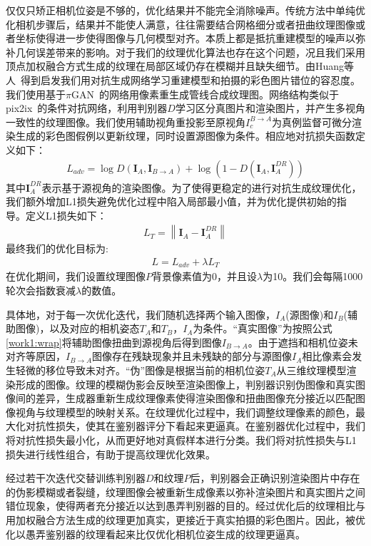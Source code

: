 仅仅只矫正相机位姿是不够的，优化结果并不能完全消除噪声。传统方法中单纯优化相机步骤后，结果并不能使人满意，往往需要结合网格细分或者扭曲纹理图像或者坐标使得进一步使得图像与几何模型对齐。本质上都是抵抗重建模型的噪声以弥补几何误差带来的影响。对于我们的纹理优化算法也存在这个问题，况且我们采用顶点加权融合方式生成的纹理在局部区域仍存在模糊并且缺失细节。由Huang等人~\cite{JingweiHuang2020AdversarialTO}得到启发我们用对抗生成网络学习重建模型和拍摄的彩色图片错位的容忍度。我们使用基于$\pi$GAN~\cite{chanmonteiro2020pi-GAN,liu2018intriguing}的网络用像素重生成管线合成纹理图。网络结构类似于pix2ix~\cite{isola2017image}的条件对抗网络，利用判别器$D$学习区分真图片和渲染图片，并产生多视角一致性的纹理图像。我们使用辅助视角重投影至原视角$I_c^{B\to A}$为真例监督可微分渲染生成的彩色图假例以更新纹理，同时设置源图像为条件。相应地对抗损失函数定义如下：
\begin{align}
	L_{a d v}=\log D\left(\boldsymbol{I}_{A}, \boldsymbol{I}_{B \rightarrow A}\right)+\log \left(1-D\left(\boldsymbol{I}_{A}, \boldsymbol{I}_{A}^{D R}\right)\right) 
\end{align}
其中$\boldsymbol{I}_{A}^{D R}$表示基于源视角的渲染图像。为了使得更稳定的进行对抗生成纹理优化，我们额外增加L1损失避免优化过程中陷入局部最小值，并为优化提供初始的指导。定义L1损失如下：
\begin{align}
L_T = \left \| \boldsymbol{I}_{A}- \boldsymbol{I}_{A}^{D R} \right \| 
\end{align}
最终我们的优化目标为:
\begin{align}
	L = L_{adv} + \lambda L_T
\end{align}
在优化期间，我们设置纹理图像$P$背景像素值为0，并且设$\lambda$为10。我们会每隔1000轮次会指数衰减$\lambda$的数值。\par
具体地，对于每一次优化迭代，我们随机选择两个输入图像，$I_A$(源图像)和$I_B$(辅助图像)，以及对应的相机姿态$T_A$和$T_B$，$I_A$为条件。“真实图像”为按照公式\ref{work1:wrap}将辅助图像扭曲到源视角后得到图像$I_{B\to A}$。由于遮挡和相机位姿未对齐等原因，$I_{B\to A}$图像存在残缺现象并且未残缺的部分与源图像$I_A$相比像素会发生轻微的移位导致未对齐。“伪”图像是根据当前的相机位姿$T_A$从三维纹理模型渲染形成的图像。纹理的模糊伪影会反映至渲染图像上，判别器识别伪图像和真实图像间的差异，生成器重新生成纹理像素使得渲染图像和扭曲图像充分接近以匹配图像视角与纹理模型的映射关系。在纹理优化过程中，我们调整纹理像素的颜色，最大化对抗性损失，使其在鉴别器评分下看起来更逼真。在鉴别器优化过程中，我们将对抗性损失最小化，从而更好地对真假样本进行分类。我们将对抗性损失与L1损失进行线性组合，有助于提高纹理优化效果。\par
经过若干次迭代交替训练判别器$D$和纹理$P$后，判别器会正确识别渲染图片中存在的伪影模糊或者裂缝，纹理图像会被重新生成像素以弥补渲染图片和真实图片之间错位现象，使得两者充分接近以达到愚弄判别器的目的。经过优化后的纹理相比与用加权融合方法生成的纹理更加真实，更接近于真实拍摄的彩色图片。因此，被优化以愚弄鉴别器的纹理看起来比仅优化相机位姿生成的纹理更逼真。\par


